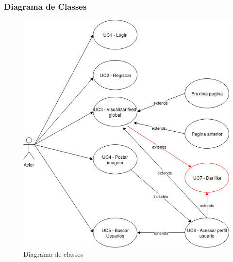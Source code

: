 \subsubsection{Diagrama de Classes}
\begin{figure}[ht]
	\centering
	\includegraphics[width=\textwidth]{./g/casodeuso.png}
	\caption{Diagrama de classes}
	\label{fig:diagramaDeClasse}
\end{figure}

